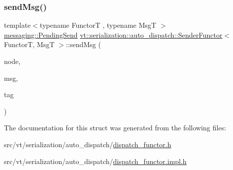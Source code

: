 \subsubsection{\texorpdfstring{send\+Msg()}{sendMsg()}}
{\footnotesize\ttfamily template$<$typename FunctorT , typename MsgT $>$ \\
\hyperlink{structvt_1_1messaging_1_1_pending_send}{messaging\+::\+Pending\+Send} \hyperlink{structvt_1_1serialization_1_1auto__dispatch_1_1_sender_functor}{vt\+::serialization\+::auto\+\_\+dispatch\+::\+Sender\+Functor}$<$ FunctorT, MsgT $>$\+::send\+Msg (\begin{DoxyParamCaption}\item[{\hyperlink{namespacevt_a866da9d0efc19c0a1ce79e9e492f47e2}{Node\+Type} const \&}]{node,  }\item[{MsgT $\ast$}]{msg,  }\item[{\hyperlink{namespacevt_a84ab281dae04a52a4b243d6bf62d0e52}{Tag\+Type} const \&}]{tag }\end{DoxyParamCaption})\hspace{0.3cm}{\ttfamily [static]}}



The documentation for this struct was generated from the following files\+:\begin{DoxyCompactItemize}
\item 
src/vt/serialization/auto\+\_\+dispatch/\hyperlink{dispatch__functor_8h}{dispatch\+\_\+functor.\+h}\item 
src/vt/serialization/auto\+\_\+dispatch/\hyperlink{dispatch__functor_8impl_8h}{dispatch\+\_\+functor.\+impl.\+h}\end{DoxyCompactItemize}
